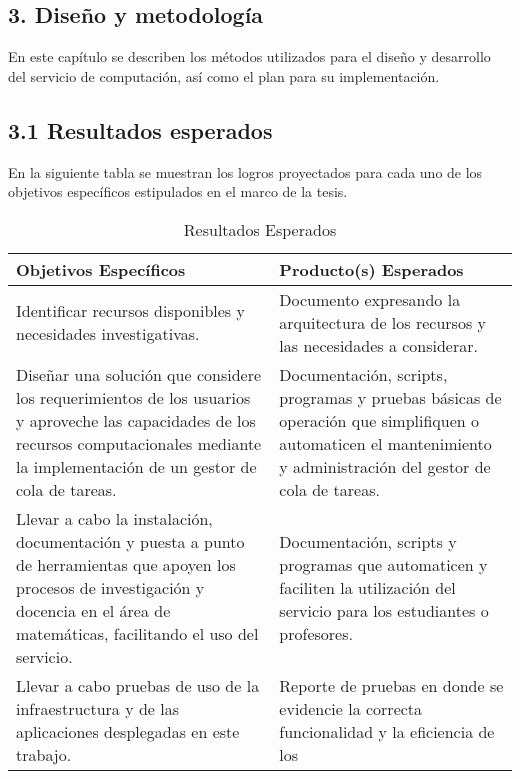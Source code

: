 \begin{spacing}{1.5}
  \begin{tightcenter}
    \section{3. Diseño y metodología}
    \mylinespacing
  \end{tightcenter}

  En este capítulo se describen los métodos utilizados para el diseño y desarrollo del servicio de computación, así como el plan para su implementación.

  \subsection{3.1 Resultados esperados}

  En la siguiente tabla se muestran los logros proyectados para cada uno de los objetivos específicos estipulados en el marco de la tesis.

  \begin{table}[h]
    \centering
    \begin{tabular}{p{7cm}|p{7cm}}
      \hline
      \textbf{Objetivos Específicos}                                 & \textbf{Producto(s) Esperados} \\
      \hline
      Identificar recursos disponibles y necesidades investigativas. &
      Documento expresando la arquitectura de los recursos y las necesidades a
      considerar.                                                                                     \\
      \hline
      Diseñar una solución que considere los requerimientos de los usuarios y
      aproveche las capacidades de los recursos computacionales mediante la
      implementación de un gestor de cola de tareas.                 & Documentación, scripts,
      programas y pruebas básicas de operación que simplifiquen o automaticen el
      mantenimiento y administración del gestor de cola de tareas.                                    \\
      \hline
      Llevar a cabo la instalación, documentación y puesta a punto de
      herramientas que apoyen los procesos de investigación y docencia en el área de
      matemáticas, facilitando el uso del servicio.                  & Documentación, scripts y
      programas que automaticen y faciliten la utilización del servicio para los
      estudiantes o profesores.                                                                       \\
      \hline
      Llevar a cabo pruebas de uso de la infraestructura y de las
      aplicaciones desplegadas en este trabajo.                      & Reporte de pruebas en donde se
      evidencie la correcta funcionalidad y la eficiencia de los                                      \\
      \hline
    \end{tabular}
    \caption{Resultados Esperados}
    \label{table:table2}
  \end{table}


\end{spacing}
